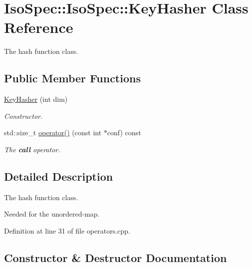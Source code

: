 \hypertarget{class_iso_spec_1_1_iso_spec_1_1_key_hasher}{}\section{Iso\+Spec\+:\+:Iso\+Spec\+:\+:Key\+Hasher Class Reference}
\label{class_iso_spec_1_1_iso_spec_1_1_key_hasher}


The hash function class.  


\subsection*{Public Member Functions}
\begin{DoxyCompactItemize}
\item 
\mbox{\hyperlink{class_iso_spec_1_1_iso_spec_1_1_key_hasher_a094e6c2b6a3c9fa09b81187cbdf50de3}{Key\+Hasher}} (int dim)
\begin{DoxyCompactList}\small\item\em Constructor. \end{DoxyCompactList}\item 
std\+::size\+\_\+t \mbox{\hyperlink{class_iso_spec_1_1_iso_spec_1_1_key_hasher_a4e3d55fd75979e5b725ad0112052f046}{operator()}} (const int $\ast$conf) const
\begin{DoxyCompactList}\small\item\em The {\bfseries call} operator. \end{DoxyCompactList}\end{DoxyCompactItemize}


\subsection{Detailed Description}
The hash function class. 

Needed for the unordered-\/map. 

Definition at line 31 of file operators.\+cpp.



\subsection{Constructor \& Destructor Documentation}
\mbox{\label{class_iso_spec_1_1_iso_spec_1_1_key_hasher_a094e6c2b6a3c9fa09b81187cbdf50de3}} 
